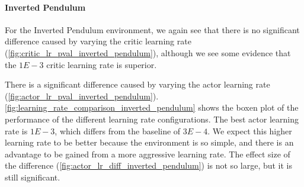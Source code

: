 \documentclass{article}
\begin{document}
\clearpage
\paragraph{Inverted Pendulum}
For the Inverted Pendulum environment, we again see that there is no significant difference caused by varying the critic learning rate (\autoref{fig:critic_lr_pval_inverted_pendulum}), although we see some evidence that the \(1E-3\) critic learning rate is superior.

There is a significant difference caused by varying the actor learning rate (\autoref{fig:actor_lr_pval_inverted_pendulum}). \autoref{fig:learning_rate_comparison_inverted_pendulum} shows the boxen plot of the performance of the different learning rate configurations. The best actor learning rate is \(1E-3\), which differs from the baseline of \(3E-4\). We expect this higher learning rate to be better because the environment is so simple, and there is an advantage to be gained from a more aggressive learning rate. The effect size of the difference (\autoref{fig:actor_lr_diff_inverted_pendulum}) is not so large, but it is still significant.
\end{document}
